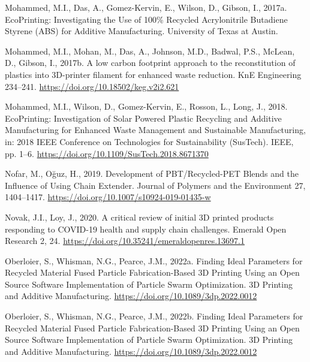 \documentclass[
  12pt,
]{article}
\newlength{\cslhangindent}
\newlength{\cslentryspacingunit} %
\newenvironment{CSLReferences}[2] %
 {%
  \setlength{\parindent}{0pt}
  \ifodd #1
  \let\oldpar\par
  \def\par{\hangindent=\cslhangindent\oldpar}
  \fi
  \setlength{\parskip}{#2\cslentryspacingunit}
 }%
 {}
\begin{document}
\begin{CSLReferences}{1}{0}
\leavevmode{}%
Mohammed, M.I., Das, A., Gomez-Kervin, E., Wilson, D., Gibson, I.,
2017a. {EcoPrinting}: {Investigating} the {Use} of 100\% {Recycled
Acrylonitrile Butadiene Styrene} ({ABS}) for {Additive Manufacturing}.
{University of Texas at Austin}.

\leavevmode{}%
Mohammed, M.I., Mohan, M., Das, A., Johnson, M.D., Badwal, P.S., McLean,
D., Gibson, I., 2017b. A low carbon footprint approach to the
reconstitution of plastics into {3D-printer} filament for enhanced waste
reduction. KnE Engineering 234--241.
\url{https://doi.org/10.18502/keg.v2i2.621}

\leavevmode{}%
Mohammed, M.I., Wilson, D., Gomez-Kervin, E., Rosson, L., Long, J.,
2018. {EcoPrinting}: {Investigation} of {Solar Powered Plastic
Recycling} and {Additive Manufacturing} for {Enhanced Waste Management}
and {Sustainable Manufacturing}, in: 2018 {IEEE Conference} on
{Technologies} for {Sustainability} ({SusTech}). {IEEE}, pp. 1--6.
\url{https://doi.org/10.1109/SusTech.2018.8671370}

\leavevmode{}%
Nofar, M., Oğuz, H., 2019. Development of {PBT}/{Recycled-PET Blends}
and the {Influence} of {Using Chain Extender}. Journal of Polymers and
the Environment 27, 1404--1417.
\url{https://doi.org/10.1007/s10924-019-01435-w}

\leavevmode{}%
Novak, J.I., Loy, J., 2020. A critical review of initial {3D} printed
products responding to {COVID-19} health and supply chain challenges.
Emerald Open Research 2, 24.
\url{https://doi.org/10.35241/emeraldopenres.13697.1}

\leavevmode{}%
Oberloier, S., Whisman, N.G., Pearce, J.M., 2022a. Finding {Ideal
Parameters} for {Recycled Material Fused Particle Fabrication-Based 3D
Printing Using} an {Open Source Software Implementation} of {Particle
Swarm Optimization}. 3D Printing and Additive Manufacturing.
\url{https://doi.org/10.1089/3dp.2022.0012}

\leavevmode{}%
Oberloier, S., Whisman, N.G., Pearce, J.M., 2022b. Finding {Ideal
Parameters} for {Recycled Material Fused Particle Fabrication-Based 3D
Printing Using} an {Open Source Software Implementation} of {Particle
Swarm Optimization}. 3D Printing and Additive Manufacturing.
\url{https://doi.org/10.1089/3dp.2022.0012}


\end{CSLReferences}
\end{document}
